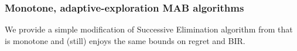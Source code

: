 \subsubsection{Monotone, adaptive-exploration MAB algorithms}
\label{app:MAB-monotone-smart}

We provide a simple modification of Successive Elimination algorithm from \citep{EvenDar-icml06} that is monotone and (still) enjoys the same bounds on regret and BIR. 
%





